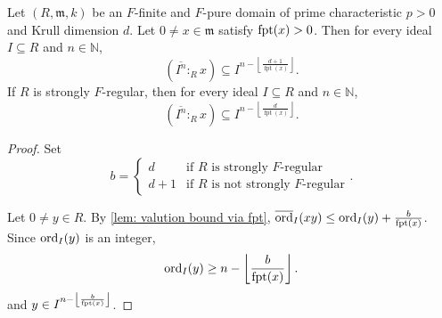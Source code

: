 \documentclass[12pt]{amsart}
\numberwithin{equation}{theorem}
\theoremstyle{plain}
\newcommand{\fm}{\mathfrak{m}}
\newcommand{\NN}{\mathbb{N}}
\DeclareMathOperator{\FPT}{fpt}
\begin{document}
\begin{corollary}
    \label{cor: Artin Rees bound via Fpure threshold}
    Let $(R,\fm,k)$ be an $F$-finite and $F$-pure domain of prime characteristic $p>0$ and Krull dimension $d$. Let $0\not=x\in \fm$ satisfy $\operatorname{{fpt}}(x)>0$. Then for every ideal $I\subseteq R$ and $n\in\NN$,
    \[
    \left(\overline{I^{n}}:_Rx\right)\subseteq I^{n-\left\lfloor \frac{d+1}{\FPT(x)}\right\rfloor}.
    \]
    If $R$ is strongly $F$-regular, then
    for every ideal $I\subseteq R$ and $n\in\NN$,
    \[
    \left(\overline{I^{n}}:_Rx\right)\subseteq I^{n-\left\lfloor \frac{d}{\FPT(x)}\right\rfloor}.
    \]
\end{corollary}

\begin{proof}
    Set
    \[
        b = \begin{cases}
        d & \mbox{if $R$ is strongly $F$-regular}\\
        d+1 & \mbox{if $R$ is not strongly $F$-regular}
        \end{cases}.
    \]
    
    Let $0\not=y\in R$. By \cref{lem: valution bound via fpt}, $\overline{\ord}_{I}(xy)\leq \ord_{I}(y) +\frac{b}{\FPT(x)}$. Since $\operatorname{{ord}}_I(y)$ is an integer,
    \[
        \operatorname{{ord}}_I(y)\geq n - \left\lfloor \frac{b}{\operatorname{{fpt}}(x)} \right\rfloor.
    \]
    and $y\in I^{n-\left\lfloor \frac{b}{\operatorname{{fpt}}(x)}\right\rfloor}$.
\end{proof}
\end{document}
